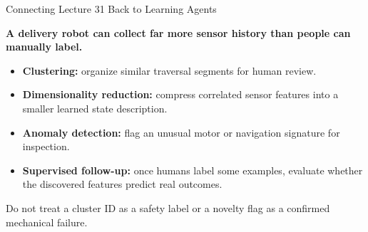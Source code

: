 \documentclass[aspectratio=169,10pt]{beamer}
\newcommand{\conceptlead}[1]{{\small\bfseries\color{CalPolyGreen}#1\par}}
\begin{document}
\begin{frame}{Connecting Lecture 31 Back to Learning Agents}
\small
\conceptlead{A delivery robot can collect far more sensor history than people can manually label.}
\begin{itemize}
\item \textbf{Clustering:} organize similar traversal segments for human review.
\item \textbf{Dimensionality reduction:} compress correlated sensor features into a smaller learned state description.
\item \textbf{Anomaly detection:} flag an unusual motor or navigation signature for inspection.
\item \textbf{Supervised follow-up:} once humans label some examples, evaluate whether the discovered features predict real outcomes.
\end{itemize}
\begin{keyidea}Do not treat a cluster ID as a safety label or a novelty flag as a confirmed mechanical failure.\end{keyidea}
\end{frame}
\end{document}
